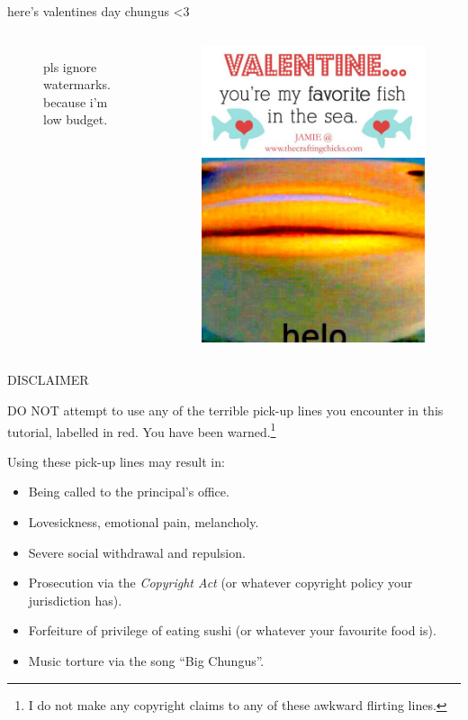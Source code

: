 \documentclass{beamer}
\begin{document}
\begin{frame}{here's valentines day chungus \textless 3}
\begin{columns}
\begin{figure}[h]
pls ignore watermarks.\\
because i'm low budget.
\end{figure}
\begin{figure}[h]
\centering
\includegraphics[scale=1]{img/favorite_fish.jpg}
\end{figure}
\end{columns}
\end{frame}

\begin{frame}{DISCLAIMER}

{\color{red} DO NOT attempt to use any of the terrible pick-up lines you encounter in this tutorial, labelled in red. You have been warned.}\footnote{I do not make any copyright claims to any of these awkward flirting lines.}

Using these pick-up lines may result in:
\begin{itemize}
\item Being called to the principal's office.
\item Lovesickness, emotional pain, melancholy.
\item Severe social withdrawal and repulsion.
\item Prosecution via the \textit{Copyright Act} (or whatever copyright policy your jurisdiction has).
\item Forfeiture of privilege of eating sushi (or whatever your favourite food is). 
\item Music torture via the song ``Big Chungus''.
\end{itemize}
\end{frame}
\end{document}
